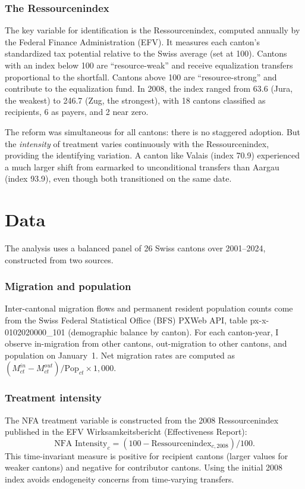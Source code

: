\documentclass[12pt]{article}
\begin{document}
\subsubsection*{The Ressourcenindex} The key variable for identification is the Ressourcenindex, computed annually by the Federal Finance Administration (EFV). It measures each canton's standardized tax potential relative to the Swiss average (set at 100). Cantons with an index below 100 are ``resource-weak'' and receive equalization transfers proportional to the shortfall. Cantons above 100 are ``resource-strong'' and contribute to the equalization fund. In 2008, the index ranged from 63.6 (Jura, the weakest) to 246.7 (Zug, the strongest), with 18 cantons classified as recipients, 6 as payers, and 2 near zero.

The reform was simultaneous for all cantons: there is no staggered adoption. But the \textit{intensity} of treatment varies continuously with the Ressourcenindex, providing the identifying variation. A canton like Valais (index 70.9) experienced a much larger shift from earmarked to unconditional transfers than Aargau (index 93.9), even though both transitioned on the same date.

\section{Data}

The analysis uses a balanced panel of 26 Swiss cantons over 2001--2024, constructed from two sources.

\subsubsection*{Migration and population} Inter-cantonal migration flows and permanent resident population counts come from the Swiss Federal Statistical Office (BFS) PXWeb API, table px-x-0102020000\_101 (demographic balance by canton). For each canton-year, I observe in-migration from other cantons, out-migration to other cantons, and population on January~1. Net migration rates are computed as $(M^{in}_{ct} - M^{out}_{ct}) / \text{Pop}_{ct} \times 1{,}000$.

\subsubsection*{Treatment intensity} The NFA treatment variable is constructed from the 2008 Ressourcenindex published in the EFV Wirksamkeitsbericht (Effectiveness Report):
\[
\text{NFA Intensity}_c = (100 - \text{Ressourcenindex}_{c,2008}) / 100.
\]
This time-invariant measure is positive for recipient cantons (larger values for weaker cantons) and negative for contributor cantons. Using the initial 2008 index avoids endogeneity concerns from time-varying transfers.
\end{document}
